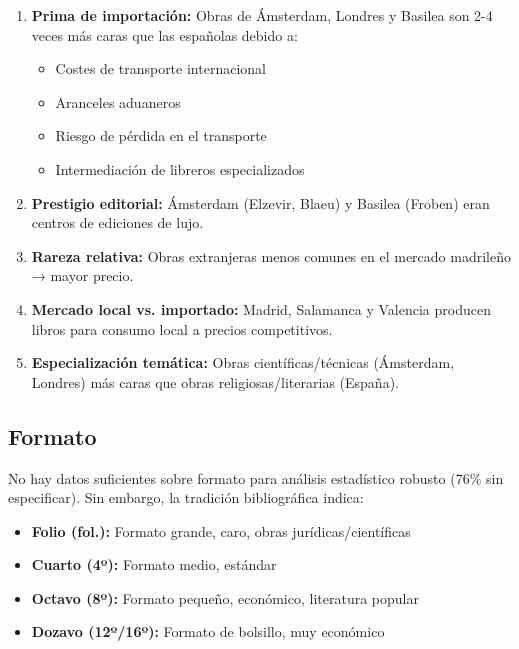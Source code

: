 \documentclass[12pt,a4paper]{article}
\begin{document}
\begin{enumerate}
    \item \textbf{Prima de importación:} Obras de Ámsterdam, Londres y Basilea son 2-4 veces más caras que las españolas debido a:
    \begin{itemize}
        \item Costes de transporte internacional
        \item Aranceles aduaneros
        \item Riesgo de pérdida en el transporte
        \item Intermediación de libreros especializados
    \end{itemize}

    \item \textbf{Prestigio editorial:} Ámsterdam (Elzevir, Blaeu) y Basilea (Froben) eran centros de ediciones de lujo.

    \item \textbf{Rareza relativa:} Obras extranjeras menos comunes en el mercado madrileño → mayor precio.

    \item \textbf{Mercado local vs. importado:} Madrid, Salamanca y Valencia producen libros para consumo local a precios competitivos.

    \item \textbf{Especialización temática:} Obras científicas/técnicas (Ámsterdam, Londres) más caras que obras religiosas/literarias (España).
\end{enumerate}

\subsection{Formato}

No hay datos suficientes sobre formato para análisis estadístico robusto (76\% sin especificar). Sin embargo, la tradición bibliográfica indica:

\begin{itemize}
    \item \textbf{Folio (fol.):} Formato grande, caro, obras jurídicas/científicas
    \item \textbf{Cuarto (4º):} Formato medio, estándar
    \item \textbf{Octavo (8º):} Formato pequeño, económico, literatura popular
    \item \textbf{Dozavo (12º/16º):} Formato de bolsillo, muy económico
\end{itemize}
\end{document}
